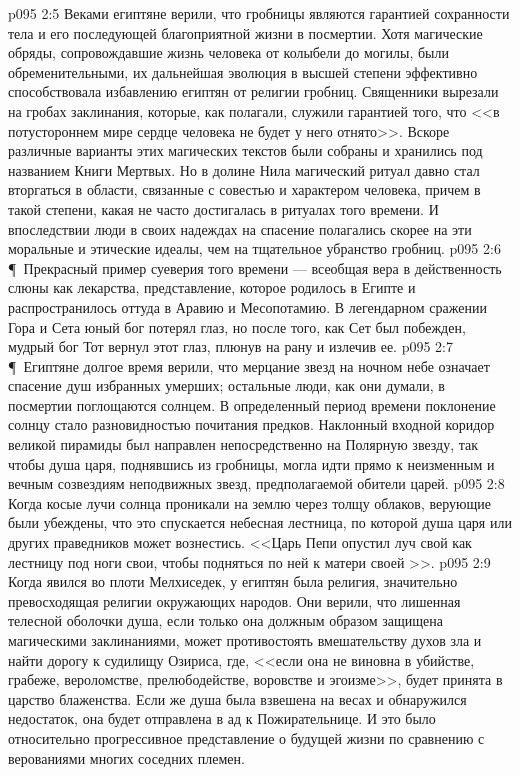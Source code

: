 \vs p095 2:5 Веками египтяне верили, что гробницы являются гарантией сохранности тела и его последующей благоприятной жизни в посмертии. Хотя магические обряды, сопровождавшие жизнь человека от колыбели до могилы, были обременительными, их дальнейшая эволюция в высшей степени эффективно способствовала избавлению египтян от религии гробниц. Священники вырезали на гробах заклинания, которые, как полагали, служили гарантией того, что <<в потустороннем мире сердце человека не будет у него отнято>>. Вскоре различные варианты этих магических текстов были собраны и хранились под названием Книги Мертвых. Но в долине Нила магический ритуал давно стал вторгаться в области, связанные с совестью и характером человека, причем в такой степени, какая не часто достигалась в ритуалах того времени. И впоследствии люди в своих надеждах на спасение полагались скорее на эти моральные и этические идеалы, чем на тщательное убранство гробниц.
\vs p095 2:6 \P\ Прекрасный пример суеверия того времени --- всеобщая вера в действенность слюны как лекарства, представление, которое родилось в Египте и распространилось оттуда в Аравию и Месопотамию. В легендарном сражении Гора и Сета юный бог потерял глаз, но после того, как Сет был побежден, мудрый бог Тот вернул этот глаз, плюнув на рану и излечив ее.
\vs p095 2:7 \P\ Египтяне долгое время верили, что мерцание звезд на ночном небе означает спасение душ избранных умерших; остальные люди, как они думали, в посмертии поглощаются солнцем. В определенный период времени поклонение солнцу стало разновидностью почитания предков. Наклонный входной коридор великой пирамиды был направлен непосредственно на Полярную звезду, так чтобы душа царя, поднявшись из гробницы, могла идти прямо к неизменным и вечным созвездиям неподвижных звезд, предполагаемой обители царей.
\vs p095 2:8 Когда косые лучи солнца проникали на землю через толщу облаков, верующие были убеждены, что это спускается небесная лестница, по которой душа царя или других праведников может вознестись. <<Царь Пепи опустил луч свой как лестницу под ноги свои, чтобы подняться по ней к матери своей >>.
\vs p095 2:9 Когда явился во плоти Мелхиседек, у египтян была религия, значительно превосходящая религии окружающих народов. Они верили, что лишенная телесной оболочки душа, если только она должным образом защищена магическими заклинаниями, может противостоять вмешательству духов зла и найти дорогу к судилищу Озириса, где, <<если она не виновна в убийстве, грабеже, вероломстве, прелюбодействе, воровстве и эгоизме>>, будет принята в царство блаженства. Если же душа была взвешена на весах и обнаружился недостаток, она будет отправлена в ад к Пожирательнице. И это было относительно прогрессивное представление о будущей жизни по сравнению с верованиями многих соседних племен.
